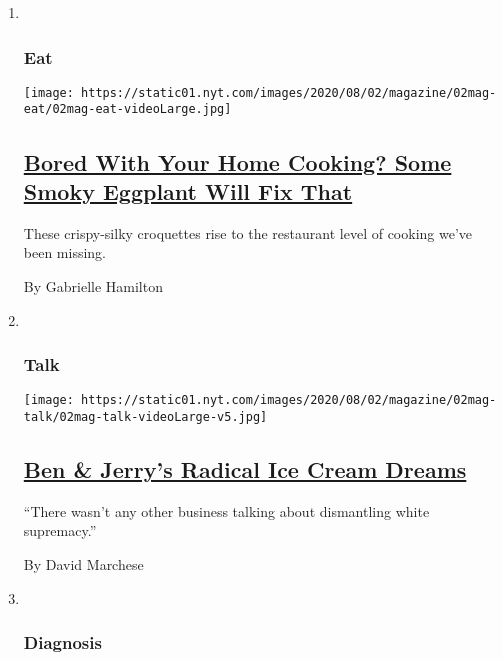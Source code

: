 \begin{enumerate}
\def\labelenumi{\arabic{enumi}.}
\item ~
  \hypertarget{eat}{%
  \subsubsection{Eat}\label{eat}}

  \texttt{[image: https://static01.nyt.com/images/2020/08/02/magazine/02mag-eat/02mag-eat-videoLarge.jpg]}

  \hypertarget{bored-with-your-home-cooking-some-smoky-eggplant-will-fix-that}{%
  \subsection{\texorpdfstring{\href{/2020/07/29/magazine/bored-with-your-home-cooking-some-smoky-eggplant-will-fix-that.html}{Bored
  With Your Home Cooking? Some Smoky Eggplant Will Fix
  That}}{Bored With Your Home Cooking? Some Smoky Eggplant Will Fix That}}\label{bored-with-your-home-cooking-some-smoky-eggplant-will-fix-that}}

  These crispy-silky croquettes rise to the restaurant level of cooking
  we've been missing.

  By Gabrielle Hamilton
\item ~
  \hypertarget{talk}{%
  \subsubsection{Talk}\label{talk}}

  \texttt{[image: https://static01.nyt.com/images/2020/08/02/magazine/02mag-talk/02mag-talk-videoLarge-v5.jpg]}

  \hypertarget{ben--jerrys-radical-ice-cream-dreams}{%
  \subsection{\texorpdfstring{\href{/interactive/2020/07/27/magazine/ben-jerry-interview.html}{Ben
  \& Jerry's Radical Ice Cream
  Dreams}}{Ben \& Jerry's Radical Ice Cream Dreams}}\label{ben--jerrys-radical-ice-cream-dreams}}

  ``There wasn't any other business talking about dismantling white
  supremacy.''

  By David Marchese
\item ~
  \hypertarget{diagnosis}{%
  \subsubsection{Diagnosis}\label{diagnosis}}


\end{enumerate}
